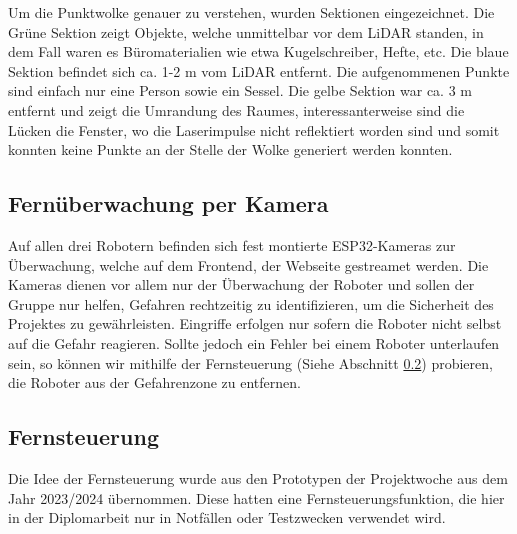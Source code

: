 Um die Punktwolke genauer zu verstehen, wurden Sektionen eingezeichnet. 
Die Grüne Sektion zeigt Objekte, welche unmittelbar vor dem LiDAR standen, in dem Fall waren es Büromaterialien wie etwa Kugelschreiber, Hefte, etc.
Die blaue Sektion befindet sich ca. 1-2 m vom LiDAR entfernt. Die aufgenommenen Punkte sind einfach nur eine Person sowie ein Sessel.
Die gelbe Sektion war ca. 3 m entfernt und zeigt die Umrandung des Raumes, interessanterweise sind die Lücken die Fenster, wo die Laserimpulse nicht reflektiert worden sind
und somit konnten keine Punkte an der Stelle der Wolke generiert werden konnten.

\subsection{Fernüberwachung per Kamera}
\label{subsec:frontend_cam_stream}
Auf allen drei Robotern befinden sich fest montierte ESP32-Kameras zur Überwachung, welche auf dem Frontend, der Webseite gestreamet werden.
Die Kameras dienen vor allem nur der Überwachung der Roboter und sollen der Gruppe nur helfen, Gefahren rechtzeitig zu identifizieren, um die Sicherheit des Projektes zu gewährleisten. Eingriffe erfolgen nur sofern die Roboter nicht selbst auf die Gefahr reagieren.
Sollte jedoch ein Fehler bei einem Roboter unterlaufen sein, so können wir mithilfe der Fernsteuerung (Siehe Abschnitt \ref{subsec:frontend_control}) probieren, die Roboter aus der Gefahrenzone zu entfernen.

\subsection{Fernsteuerung}
\label{subsec:frontend_control}
Die Idee der Fernsteuerung wurde aus den Prototypen der Projektwoche aus dem Jahr 2023/2024 übernommen. Diese hatten eine Fernsteuerungsfunktion, die hier in der Diplomarbeit nur in Notfällen oder Testzwecken verwendet wird.  

